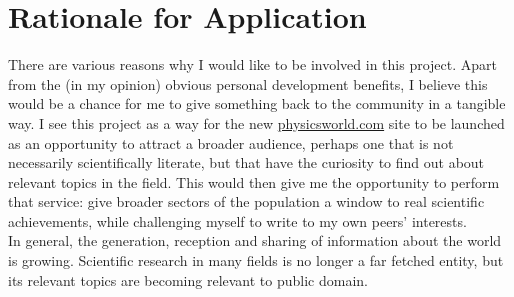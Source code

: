 \section{Rationale for Application}
There are various reasons why I would like to be involved in this project. Apart
from the (in my opinion) obvious personal development benefits, I believe this 
would be a chance for me to give something back to the community in a tangible 
way. I see this project as a way for the new \url{physicsworld.com} site to 
be launched as an 
opportunity to attract a broader audience, perhaps one that is not necessarily
scientifically literate, but that have the curiosity to find out about relevant
topics in the field. This would then give me the opportunity to perform that 
service: give broader sectors of the population a window to real scientific 
achievements, while challenging myself to write to my own peers' interests. 
\medskip\\In general, the generation, reception and sharing of information about the world
is growing. Scientific research in many fields is no longer a far fetched entity, 
but its relevant topics are becoming relevant to public domain.
